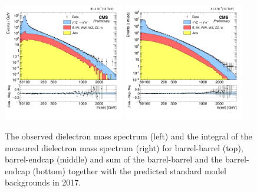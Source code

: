 \begin{figure}[ht]
\begin{center}
    \includegraphics[width=0.47\textwidth]{figures/Zprime/2017/mass/massHist}
    \includegraphics[width=0.47\textwidth]{figures/Zprime/2017/mass/cMassHist}
    \caption{The observed dielectron mass spectrum (left) and the integral of the measured dielectron mass spectrum (right) for barrel-barrel (top), barrel-endcap (middle) and sum of the barrel-barrel and the barrel-endcap (bottom) together with the predicted standard model backgrounds in 2017.}
    \label{mass_2017}
  \end{center}
\end{figure}



